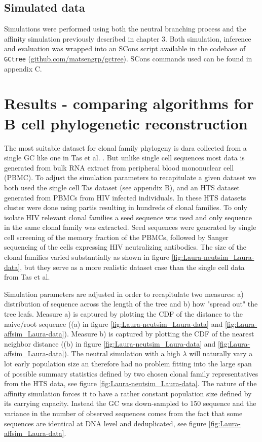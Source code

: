 \subsection{Simulated data}
Simulations were performed using both the neutral branching process and the affinity simulation previously described in chapter 3.
Both simulation, inference and evaluation was wrapped into an SCons script \cite{fomel2007reproducible} available in the codebase of \texttt{GCtree} (\url{github.com/matsengrp/gctree}).
SCons commands used can be found in appendix C.





\section{Results - comparing algorithms for B cell phylogenetic reconstruction}
The most suitable dataset for clonal family phylogeny is dara collected from a single GC like one in Tas et al. \cite{tas2016visualizing}.
But unlike single cell sequences most data is generated from bulk RNA extract from peripheral blood mononuclear cell (PBMC).
To adjust the simulation parameters to recapitulate a given dataset we both used the single cell Tas dataset (see appendix B), and an HTS dataset generated from PBMCs from HIV infected individuals.
In these HTS datasets cluster were done using partis resulting in hundreds of clonal families.
To only isolate HIV relevant clonal families a seed sequence was used and only sequence in the same clonal family was extracted.
Seed sequences were generated by single cell screening of the memory fraction of the PBMCs, followed by Sanger sequencing of the cells expressing HIV neutralizing antibodies.
The size of the clonal families varied substantially as shown in figure \ref{fig:Laura-neutsim_Laura-data}, but they serve as a more realistic dataset case than the single cell data from Tas et al.


Simulation parameters are adjusted in order to recapitulate two measures: a) distribution of sequence across the length of the tree and b) how "spread out" the tree leafs.
Measure a) is captured by plotting the CDF of the distance to the naive/root sequence ((a) in figure \ref{fig:Laura-neutsim_Laura-data} and \ref{fig:Laura-affsim_Laura-data}).
Measure b) is captured by plotting the CDF of the nearest neighbor distance ((b) in figure \ref{fig:Laura-neutsim_Laura-data} and \ref{fig:Laura-affsim_Laura-data}).
The neutral simulation with a high $\lambda$ will naturally vary a lot early population size an therefore had no problem fitting into the large span of possible summary statistics defined by two chosen clonal family representatives from the HTS data, see figure \ref{fig:Laura-neutsim_Laura-data}.
The nature of the affinity simulation forces it to have a rather constant population size defined by its carrying capacity.
Instead the GC was down-sampled to 150 sequence and the variance in the number of observed sequences comes from the fact that some sequences are identical at DNA level and deduplicated, see figure \ref{fig:Laura-affsim_Laura-data}.


